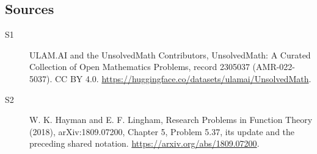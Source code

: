 \documentclass[11pt]{article}
\begin{document}
\subsection{Sources}
\begin{description}
\item[\hypertarget{source:2305037:1}{S1}] ULAM.AI and the UnsolvedMath Contributors, UnsolvedMath: A Curated Collection of Open Mathematics Problems, record 2305037 (AMR-022-5037). CC BY 4.0. \url{https://huggingface.co/datasets/ulamai/UnsolvedMath}.
\item[\hypertarget{source:2305037:2}{S2}] W. K. Hayman and E. F. Lingham, Research Problems in Function Theory (2018), arXiv:1809.07200, Chapter 5, Problem 5.37, its update and the preceding shared notation. \url{https://arxiv.org/abs/1809.07200}.
\end{description}
\label{end:2305037}
\end{document}
